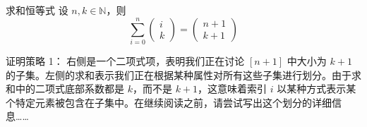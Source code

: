 \begin{theorem}{求和恒等式}\label{theorem8.4.5}
    设 $n,k \in \mathbb{N}$，则
    \[\sum_{i=0}^{n} \begin{pmatrix}i\\k\end{pmatrix} = \begin{pmatrix}n+1\\k+1\end{pmatrix}\]
\end{theorem}

\begin{questions}{证明策略 1：}
    右侧是一个二项式项，表明我们正在讨论 $[n+1]$ 中大小为 $k+1$ 的子集。左侧的求和表示我们正在根据某种属性对所有这些子集进行划分。由于求和中的二项式底部系数都是 $k$，而不是 $k+1$，这意味着索引 $i$ 以某种方式表示某个特定元素被包含在子集中。在继续阅读之前，请尝试写出这个划分的详细信息……
\end{questions}

